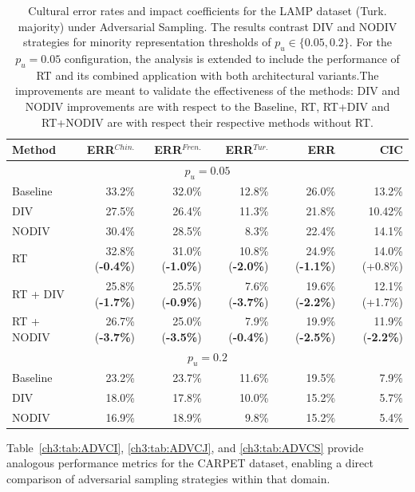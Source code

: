 \begin{table}
\centering
\small
\begin{tabular}{lrrrrr}
\toprule
\textbf{Method} & \textbf{ERR$^{Chin.}$} & \textbf{ERR$^{Fren.}$} & \textbf{ERR$^{Tur.}$} & \textbf{ERR} & \textbf{CIC} \\
\midrule
\multicolumn{6}{c}{$p_u=0.05$} \\
\midrule
Baseline & 33.2\%&	32.0\%&	12.8\%&	26.0\%&	13.2\%\\	
DIV & 27.5\%&	26.4\%&	11.3\%&	21.8\%&	10.42\%\\	
NODIV & 30.4\%&	28.5\%&	8.3\%&	22.4\%&	14.1\%\\
\midrule
RT              & 32.8\% (\textbf{-0.4\%}) & 31.0\% (\textbf{-1.0\%}) & 10.8\% (\textbf{-2.0\%}) & 24.9\% (\textbf{-1.1\%}) & 14.0\% (+0.8\%) \\
RT + DIV        & 25.8\% (\textbf{-1.7\%}) & 25.5\% (\textbf{-0.9\%}) & 7.6\% (\textbf{-3.7\%}) & 19.6\% (\textbf{-2.2\%}) & 12.1\% (+1.7\%) \\
RT + NODIV      & 26.7\% (\textbf{-3.7\%}) & 25.0\% (\textbf{-3.5\%}) & 7.9\% (\textbf{-0.4\%}) & 19.9\% (\textbf{-2.5\%}) & 11.9\% (\textbf{-2.2\%}) \\
\midrule
\multicolumn{6}{c}{$p_u=0.2$} \\
\midrule
Baseline & 23.2\% & 23.7\% & 11.6\% & 19.5\% & 7.9\% \\
DIV & 18.0\% & 17.8\% & 10.0\% & 15.2\% & 5.7\% \\
NODIV & 16.9\% & 18.9\% & 9.8\% & 15.2\% & 5.4\% \\
\bottomrule
\end{tabular}
\caption{Cultural error rates and impact coefficients for the LAMP dataset (Turk. majority) under Adversarial Sampling. The results contrast DIV and NODIV strategies for minority representation thresholds of $p_u \in \{0.05, 0.2\}$. For the $p_u = 0.05$ configuration, the analysis is extended to include the performance of RT and its combined application with both architectural variants.The improvements are meant to validate the effectiveness of the methods: DIV and NODIV improvements are with respect to the Baseline, RT, RT+DIV and RT+NODIV are with respect their respective methods without RT.}
\label{ch3:tab:ADVLT}
\end{table}
%

Table~\ref{ch3:tab:ADVCI}, \ref{ch3:tab:ADVCJ}, and \ref{ch3:tab:ADVCS} provide analogous performance metrics for the CARPET dataset, enabling a direct comparison of adversarial sampling strategies within that domain.


